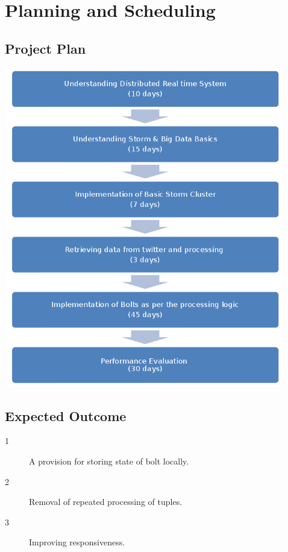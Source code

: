 \chapter{Planning and Scheduling} 
\thispagestyle{plain} 
\section{Project Plan} 
\begin{center}
\includegraphics[scale=.7]{../img/img7} \\[2mm]
\end{center}

\section{Expected Outcome}
\begin{description}
\item[1] A provision for storing state of bolt locally.\\
\item[2] Removal of repeated processing of tuples.\\
\item[3] Improving  responsiveness.  \\
\end{description}




